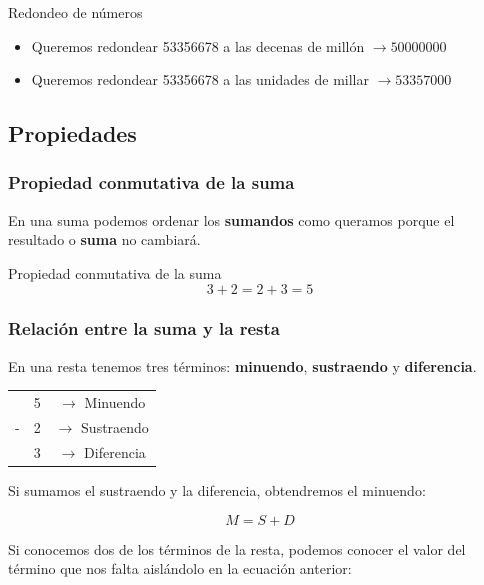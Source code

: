 \begin{ejemplos}[label={Ejemplo:redondeo}]{Redondeo de números}
    \begin{itemize}
        \item Queremos redondear 53356678 a las decenas de millón $\rightarrow 50000000$
        \item Queremos redondear 53356678 a las unidades de millar $\rightarrow 53357000$
    \end{itemize}
\end{ejemplos}

\subsection{Propiedades}

\subsubsection{Propiedad conmutativa de la suma}

En una suma podemos ordenar los \textbf{sumandos} como queramos porque el resultado o \textbf{suma} no cambiará.

\begin{ejemplos}[label={Ejemplo:conmutativa}]{Propiedad conmutativa de la suma}
    \[3 + 2 = 2 + 3 = 5 \nonumber \]
\end{ejemplos}

\subsubsection{Relación entre la suma y la resta}

En una resta tenemos tres términos: \textbf{minuendo}, \textbf{sustraendo} y \textbf{diferencia}.

\begin{center}
    \begin{tabular}{ccc}
         & 5 & $\rightarrow$ Minuendo\\
        - & 2 & $\rightarrow$ Sustraendo\\
        \hline
        & 3 & $\rightarrow$ Diferencia
    \end{tabular}
\end{center}

Si sumamos el sustraendo y la diferencia, obtendremos el minuendo:

\[M = S + D \nonumber \]

Si conocemos dos de los términos de la resta, podemos conocer el valor del término que nos falta aislándolo en la ecuación anterior:

